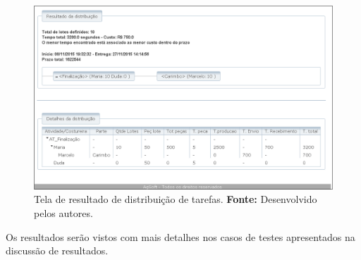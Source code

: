 \begin{figure}[h!]
	\centerline{\includegraphics[scale=0.4]{./imagens/resultado_distribuicao.png}}
	\caption[Tela de resultado de distribuição de tarefas.]
	{Tela de resultado de distribuição de tarefas.
		\textbf{Fonte:} Desenvolvido pelos autores.}
	\label{fig:tela_dis_result}
\end{figure}

\par Os resultados serão vistos com mais detalhes nos casos de testes apresentados na discussão de resultados.

